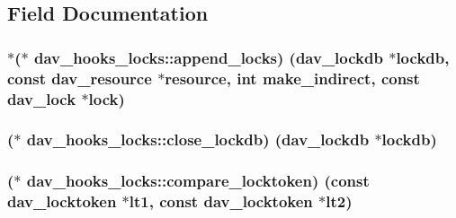 \subsection{Field Documentation}
\subsubsection[{\texorpdfstring{append\+\_\+locks}{append_locks}}]{$\ast$($\ast$ dav\+\_\+hooks\+\_\+locks\+::append\+\_\+locks) ({\bf dav\+\_\+lockdb} $\ast${\bf lockdb}, const {\bf dav\+\_\+resource} $\ast${\bf resource}, {\bf int} make\+\_\+indirect, const {\bf dav\+\_\+lock} $\ast${\bf lock})}\hypertarget{structdav__hooks__locks_a23c9799164f041357ce4ba21829113f9}{}\label{structdav__hooks__locks_a23c9799164f041357ce4ba21829113f9}
\subsubsection[{\texorpdfstring{close\+\_\+lockdb}{close_lockdb}}]{($\ast$ dav\+\_\+hooks\+\_\+locks\+::close\+\_\+lockdb) ({\bf dav\+\_\+lockdb} $\ast${\bf lockdb})}\hypertarget{structdav__hooks__locks_a24228d41a138f1eab1252ea3cc6e927d}{}\label{structdav__hooks__locks_a24228d41a138f1eab1252ea3cc6e927d}
\subsubsection[{\texorpdfstring{compare\+\_\+locktoken}{compare_locktoken}}]{($\ast$ dav\+\_\+hooks\+\_\+locks\+::compare\+\_\+locktoken) (const {\bf dav\+\_\+locktoken} $\ast$lt1, const {\bf dav\+\_\+locktoken} $\ast$lt2)}\hypertarget{structdav__hooks__locks_a16e4aba279e12074d8771a0c1ac0bbb8}{}\label{structdav__hooks__locks_a16e4aba279e12074d8771a0c1ac0bbb8}
